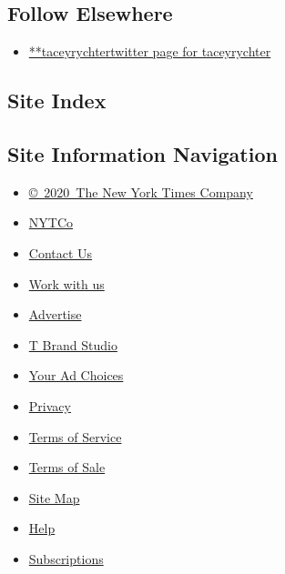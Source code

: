 \hypertarget{follow-elsewhere}{%
\subsection{Follow Elsewhere}\label{follow-elsewhere}}

\begin{itemize}
\tightlist
\item
  \href{https://twitter.com/taceyrychter}{**taceyrychtertwitter page for
  taceyrychter}
\end{itemize}

\hypertarget{site-index}{%
\subsection{Site Index}\label{site-index}}

\hypertarget{site-information-navigation}{%
\subsection{Site Information
Navigation}\label{site-information-navigation}}

\begin{itemize}
\tightlist
\item
  \href{https://help.nytimes3xbfgragh.onion/hc/en-us/articles/115014792127-Copyright-notice}{©~2020~The
  New York Times Company}
\end{itemize}

\begin{itemize}
\tightlist
\item
  \href{https://www.nytco.com/}{NYTCo}
\item
  \href{https://help.nytimes3xbfgragh.onion/hc/en-us/articles/115015385887-Contact-Us}{Contact
  Us}
\item
  \href{https://www.nytco.com/careers/}{Work with us}
\item
  \href{https://nytmediakit.com/}{Advertise}
\item
  \href{http://www.tbrandstudio.com/}{T Brand Studio}
\item
  \href{https://www.nytimes3xbfgragh.onion/privacy/cookie-policy\#how-do-i-manage-trackers}{Your
  Ad Choices}
\item
  \href{https://www.nytimes3xbfgragh.onion/privacy}{Privacy}
\item
  \href{https://help.nytimes3xbfgragh.onion/hc/en-us/articles/115014893428-Terms-of-service}{Terms
  of Service}
\item
  \href{https://help.nytimes3xbfgragh.onion/hc/en-us/articles/115014893968-Terms-of-sale}{Terms
  of Sale}
\item
  \href{https://spiderbites.nytimes3xbfgragh.onion}{Site Map}
\item
  \href{https://help.nytimes3xbfgragh.onion/hc/en-us}{Help}
\item
  \href{https://www.nytimes3xbfgragh.onion/subscription?campaignId=37WXW}{Subscriptions}
\end{itemize}
